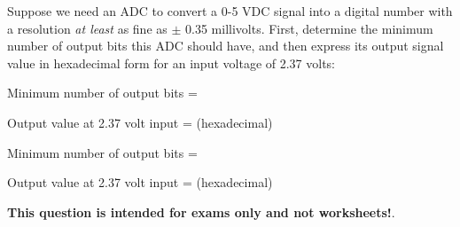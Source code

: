 

Suppose we need an ADC to convert a 0-5 VDC signal into a digital number with a resolution {\it at least} as fine as $\pm$ 0.35 millivolts.  First, determine the minimum number of output bits this ADC should have, and then express its output signal value in hexadecimal form for an input voltage of 2.37 volts:

\vskip 10pt

Minimum number of output bits = \underbar{\hskip 50pt}

\vskip 10pt

Output value at 2.37 volt input = \underbar{\hskip 50pt} (hexadecimal)







Minimum number of output bits = 

\vskip 10pt

Output value at 2.37 volt input =  (hexadecimal)








{\bf This question is intended for exams only and not worksheets!}.



